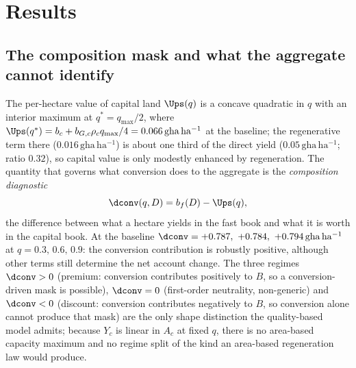 \section{Results}\label{sec:results}

\subsection{The composition mask and what the aggregate cannot identify}\label{sec:mask}

The per-hectare value of capital land $\Ups(q)$ is a concave quadratic in $q$ with an interior maximum at $q^*=q_{\max}/2$, where $\Ups(q^*)=b_c+b_{G,c}\rho_c q_{\max}/4=0.066\,\mathrm{gha\,ha^{-1}}$ at the baseline; the regenerative term there ($0.016\,\mathrm{gha\,ha^{-1}}$) is about one third of the direct yield ($0.05\,\mathrm{gha\,ha^{-1}}$; ratio $0.32$), so capital value is only modestly enhanced by regeneration. The quantity that governs what conversion does to the aggregate is the \emph{composition diagnostic}
\begin{equation}\label{eq:dconv}
\dconv(q,D)=b_f(D)-\Ups(q),
\end{equation}
the difference between what a hectare yields in the fast book and what it is worth in the capital book. At the baseline $\dconv=+0.787,\ +0.784,\ +0.794\,\mathrm{gha\,ha^{-1}}$ at $q=0.3,\,0.6,\,0.9$: the conversion contribution is robustly positive, although other terms still determine the net account change. The three regimes $\dconv>0$ (premium: conversion contributes positively to $B$, so a conversion-driven mask is possible), $\dconv=0$ (first-order neutrality, non-generic) and $\dconv<0$ (discount: conversion contributes negatively to $B$, so conversion alone cannot produce that mask) are the only shape distinction the quality-based model admits; because $Y_c$ is linear in $A_c$ at fixed $q$, there is no area-based capacity maximum and no regime split of the kind an area-based regeneration law would produce.

